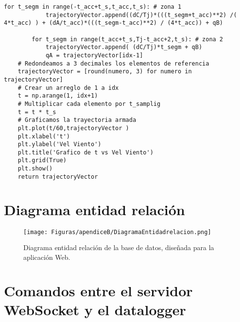 \begin{lstlisting}[style=pythonstyle, caption={Algoritmo generador de referencias para el controlador PID.}, label=cdg:genTrayectoria, basicstyle=\ttfamily\fontsize{8}{8}\selectfont]
        for t_segm in range(-t_acc+t_s,t_acc,t_s): # zona 1  
            trajectoryVector.append((dC/Tj)*(((t_segm+t_acc)**2) /( 4*t_acc) ) + (dA/t_acc)*(((t_segm-t_acc)**2) / (4*t_acc)) + qB)  
            
        for t_segm in range(t_acc+t_s,Tj-t_acc+2,t_s): # zona 2
            trajectoryVector.append( (dC/Tj)*t_segm + qB)
            qA = trajectoryVector[idx-1]
    # Redondeamos a 3 decimales los elementos de referencia
    trajectoryVector = [round(numero, 3) for numero in trajectoryVector]
    # Crear un arreglo de 1 a idx
    t = np.arange(1, idx+1)
    # Multiplicar cada elemento por t_samplig
    t = t * t_s
    # Graficamos la trayectoria armada
    plt.plot(t/60,trajectoryVector )
    plt.xlabel('t')
    plt.ylabel('Vel Viento')
    plt.title('Grafico de t vs Vel Viento')
    plt.grid(True)
    plt.show()
    return trajectoryVector
\end{lstlisting}
\newpage
\section{Diagrama entidad relación}
\begin{figure}[H]
    \centering
    \texttt{[image: Figuras/apendiceB/DiagramaEntidadrelacion.png]}
    \caption{Diagrama entidad relación de la base de datos, diseñada para la aplicación Web.}
    \label{fig:DiagramaEntidadrelacion}
\end{figure}
\newpage
\section{Comandos entre el servidor WebSocket y el datalogger}

